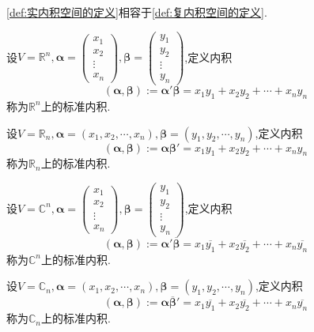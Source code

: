 \begin{red}
    \begin{remark}
        \cref{def:实内积空间的定义}相容于\cref{def:复内积空间的定义}.
    \end{remark}
\end{red}
\begin{brown}
    \begin{example}
        设$V=\mathbb{R}^n,\bm{\alpha}=\begin{pmatrix}
            x_1\\x_2\\\vdots\\x_n
        \end{pmatrix},\bm{\beta}=\begin{pmatrix}
            y_1\\y_2\\\vdots\\y_n
        \end{pmatrix}$,定义内积\[
        \left(
            \bm{\alpha},\bm{\beta}
        \right):=\bm{\alpha}'\bm{\beta}=x_1y_1+x_2y_2+\cdots+x_ny_n
        \]称为$\mathbb{R}^n$上的标准内积.

        设$V=\mathbb{R}_n,\bm{\alpha}=\left(
            x_1,x_2,\cdots,x_n
        \right),\bm{\beta}=\left(
            y_1,y_2,\cdots,y_n
        \right)$,定义内积\[\left(
            \bm{\alpha},\bm{\beta}
        \right):=\bm{\alpha}\bm{\beta}'=x_1y_1+x_2y_2+\cdots+x_ny_n\]称为$\mathbb{R}_n$上的标准内积.

        设$V=\mathbb{C}^n,\bm{\alpha}=\begin{pmatrix}
            x_1\\x_2\\\vdots\\x_n
        \end{pmatrix},\bm{\beta}=\begin{pmatrix}
            y_1\\y_2\\\vdots\\y_n
        \end{pmatrix}$,定义内积\[
        \left(
            \bm{\alpha},\bm{\beta}
            \right):=\bm{\alpha}'\overline{\bm{\beta}}=x_1\overline{y_1}+x_2\overline{y_2}+\cdots+x_n\overline{y_n}
        \]称为$\mathbb{C}^n$上的标准内积.

        设$V=\mathbb{C}_n,\bm{\alpha}=\left(
            x_1,x_2,\cdots,x_n
        \right),\bm{\beta}=\left(
            y_1,y_2,\cdots,y_n
        \right)$,定义内积\[\left(
            \bm{\alpha},\bm{\beta}
        \right):=\bm{\alpha}\overline{\bm{\beta}}'=x_1\overline{y_1}+x_2\overline{y_2}+\cdots+x_n\overline{y_n}\]称为$\mathbb{C}_n$上的标准内积.
    \end{example}
\end{brown}
